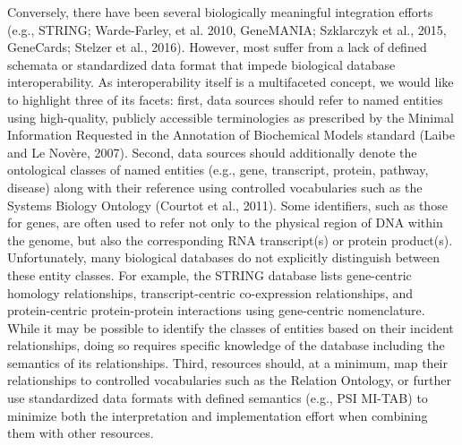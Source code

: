 Conversely, there have been several biologically meaningful integration efforts (e.g., STRING; Warde-Farley, et al. 2010, GeneMANIA; Szklarczyk et al., 2015, GeneCards; Stelzer et al., 2016).
However, most suffer from a lack of defined schemata or standardized data format that impede biological database interoperability.
As interoperability itself is a multifaceted concept, we would like to highlight three of its facets: first, data sources should refer to named entities using high-quality, publicly accessible terminologies as prescribed by the Minimal Information Requested in the Annotation of Biochemical Models standard (Laibe and Le Nov\`ere, 2007).
Second, data sources should additionally denote the ontological classes of named entities (e.g., gene, transcript, protein, pathway, disease) along with their reference using controlled vocabularies such as the Systems Biology Ontology (Courtot et al., 2011).
Some identifiers, such as those for genes, are often used to refer not only to the physical region of DNA within the genome, but also the corresponding RNA transcript(s) or protein product(s).
Unfortunately, many biological databases do not explicitly distinguish between these entity classes.
For example, the STRING database lists gene-centric homology relationships, transcript-centric co-expression relationships, and protein-centric protein-protein interactions using gene-centric nomenclature.
While it may be possible to identify the classes of entities based on their incident relationships, doing so requires specific knowledge of the database including the semantics of its relationships.
Third, resources should, at a minimum, map their relationships to controlled vocabularies such as the Relation Ontology, or further use standardized data formats with defined semantics (e.g., PSI MI-TAB) to minimize both the interpretation and implementation effort when combining them with other resources.

